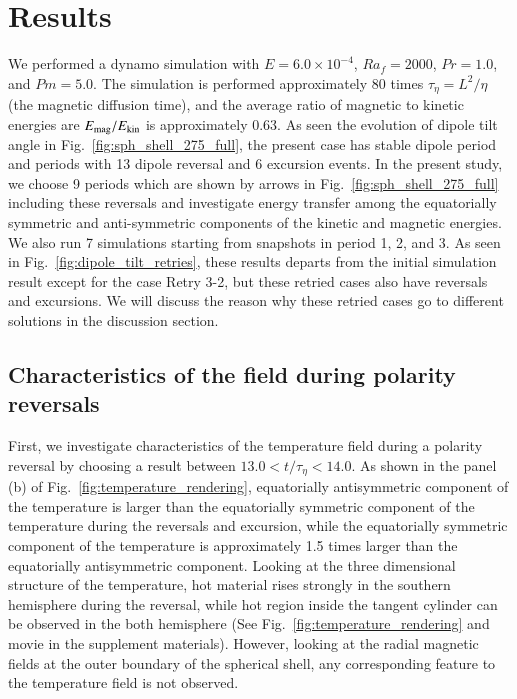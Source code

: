 \section{Results}
\label{section:results}

We performed a dynamo simulation with $E = 6.0 \times 10^{-4}$, $Ra_f = 2000$, $Pr = 1.0$, and $Pm = 5.0$. 
The simulation is performed approximately 80 times %
{\color{red}
$\tau_{\eta} = L^{2}/ \eta$ (the magnetic diffusion time), 
}
and the average ratio of magnetic to kinetic energies are $E_{\rm mag} / E_{\rm kin}$ is approximately 0.63. 
As seen the evolution of dipole tilt angle in Fig.~\ref{fig:sph_shell_275_full}, the present case has stable dipole period and periods with 13 dipole reversal and 6 excursion events. 
In the present study, we choose 9 periods which are shown by arrows in Fig.~\ref{fig:sph_shell_275_full} including these reversals and investigate energy transfer among the equatorially symmetric and anti-symmetric components of the kinetic and magnetic energies. 
We also run 7 simulations  starting from snapshots in period 1, 2, and 3. 
As seen in Fig.~\ref{fig:dipole_tilt_retries}, these results departs from the initial simulation result except for the case Retry 3-2, but these retried cases also have reversals and excursions. 
We will discuss the reason why these retried cases go to different solutions in the discussion section.

\subsection{Characteristics of the field during polarity reversals}

First, we investigate characteristics of the temperature field during a polarity reversal by choosing a result between $13.0 < t/\tau_{\eta} < 14.0$. 
As shown in the panel (b) of Fig.~\ref{fig:temperature_rendering}, equatorially antisymmetric component of the temperature is larger than the equatorially symmetric component of the temperature during the reversals and excursion, while the equatorially symmetric component of the temperature is approximately 1.5 times larger than the equatorially antisymmetric component. 
Looking at the three dimensional structure of the temperature, hot material rises strongly in the southern hemisphere during the reversal, while hot region inside the tangent cylinder can be observed in the both hemisphere (See Fig.~\ref{fig:temperature_rendering} and movie in the supplement materials). 
However, looking at the radial magnetic fields at the outer boundary of the spherical shell, any corresponding feature to the temperature field is not observed.

